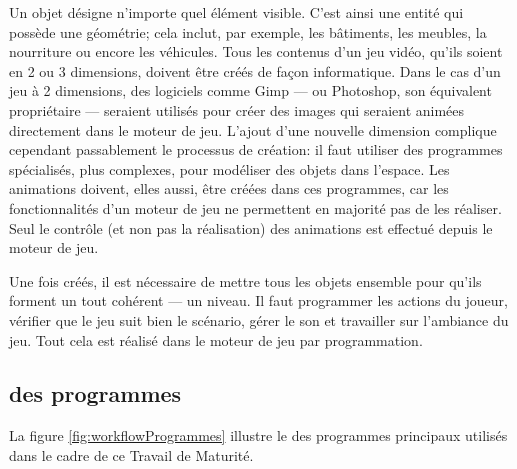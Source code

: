 Un objet désigne n'importe quel élément visible. C'est ainsi une entité qui possède une géométrie; cela inclut, par exemple, les bâtiments, les meubles, la nourriture ou encore les véhicules. Tous les contenus d'un jeu vidéo, qu'ils soient en 2 ou 3 dimensions, doivent être créés de façon informatique. Dans le cas d'un jeu à 2 dimensions, des logiciels comme Gimp --- ou Photoshop, son équivalent propriétaire --- seraient utilisés pour créer des images qui seraient animées directement dans le moteur de jeu. L'ajout d'une nouvelle dimension complique cependant passablement le processus de création: il faut utiliser des programmes spécialisés, plus complexes, pour modéliser des objets dans l'espace. Les animations doivent, elles aussi, être créées dans ces programmes, car les fonctionnalités d'un moteur de jeu ne permettent en majorité pas de les réaliser. Seul le contrôle (et non pas la réalisation) des animations est effectué depuis le moteur de jeu.

Une fois créés, il est nécessaire de mettre tous les objets ensemble pour qu'ils forment un tout cohérent --- un niveau. Il faut programmer les actions du joueur, vérifier que le jeu suit bien le scénario, gérer le son et travailler sur l'ambiance du jeu. Tout cela est réalisé dans le moteur de jeu par programmation.


\subsection[Workflow des programmes]{ des programmes}
La figure \ref{fig:workflowProgrammes} illustre le  des programmes principaux utilisés dans le cadre de ce Travail de Maturité. %

